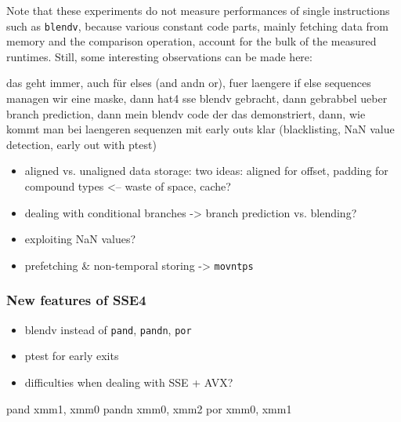 Note that these experiments do not measure performances of single instructions such as \texttt{blendv}, because various constant code parts, mainly fetching data from memory and the comparison operation, account for the bulk of the measured runtimes. Still, some interesting observations can be made here: 


das geht immer, auch für elses (and andn or), fuer laengere if else sequences managen wir eine maske, dann hat4 sse blendv gebracht, dann gebrabbel ueber branch prediction, dann mein blendv code der das demonstriert, dann, wie kommt man bei laengeren sequenzen mit early outs klar (blacklisting, NaN value detection, early out with ptest)



\begin{itemize}
\item aligned vs. unaligned data storage: two ideas: aligned for offset, padding for compound types <-- waste of space, cache?
\item dealing with conditional branches -> branch prediction vs. blending?
\item exploiting NaN values?
\item prefetching \& non-temporal storing -> \texttt{movntps}
\end{itemize}
\subsubsection{New features of SSE4}
\begin{itemize}
\item blendv instead of \texttt{pand}, \texttt{pandn}, \texttt{por}
\item ptest for early exits
\item difficulties when dealing with SSE + AVX?
\end{itemize}
\begin{assembler}
pand   xmm1, xmm0
pandn  xmm0, xmm2
por    xmm0, xmm1
\end{assembler}
